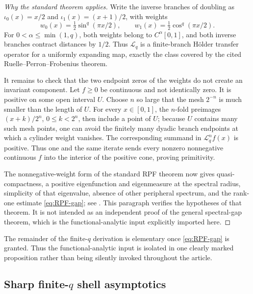\documentclass[11pt,oneside]{article}
\numberwithin{equation}{section}
\theoremstyle{definition}
\theoremstyle{remark}
\newcommand{\Transfer}{\mathcal L}
\begin{document}
\begin{proof}[Why the standard theorem applies]
Write the inverse branches of doubling as
\(\iota_0(x)=x/2\) and \(\iota_1(x)=(x+1)/2\), with weights
\[
 w_0(x)=\tfrac12\sin^q(\pi x/2),
 \qquad
 w_1(x)=\tfrac12\cos^q(\pi x/2).
\]
For \(0<\alpha\le\min(1,q)\), both weights belong to \(C^\alpha[0,1]\), and both inverse
branches contract distances by \(1/2\).  Thus \(\Transfer_q\) is a finite-branch H\"older
transfer operator for a uniformly expanding map, exactly the class covered by the cited
Ruelle--Perron--Frobenius theorem.

It remains to check that the two endpoint zeros of the weights do not create an invariant
component.  Let \(f\ge0\) be continuous and not identically zero.  It is positive on some
open interval \(U\).  Choose \(n\) so large that the mesh \(2^{-n}\) is much smaller than
the length of \(U\).  For every \(x\in[0,1]\), the \(n\)-fold preimages
\((x+k)/2^n\), \(0\le k<2^n\), then include a point of \(U\); because \(U\) contains many
such mesh points, one can avoid the finitely many dyadic branch endpoints at which a
cylinder weight vanishes.  The corresponding summand in \(\Transfer_q^nf(x)\) is positive.
Thus one and the same iterate sends every nonzero nonnegative continuous \(f\) into the
interior of the positive cone, proving primitivity.

The nonnegative-weight form of the standard RPF theorem now gives quasi-compactness, a
positive eigenfunction and eigenmeasure at the spectral radius, simplicity of that
eigenvalue, absence of other peripheral spectrum, and the rank-one estimate
\eqref{eq:RPF-gap}; see \cite{baladi,fan1997}.  This paragraph verifies the hypotheses of
that theorem.  It is not intended as an independent proof of the general spectral-gap
theorem, which is the functional-analytic input explicitly imported here.
\end{proof}

\begin{statusbox}
The remainder of the finite-\(q\) derivation is elementary once
\eqref{eq:RPF-gap} is granted.  Thus the functional-analytic input is isolated in one clearly
marked proposition rather than being silently invoked throughout the article.
\end{statusbox}

\subsection{Sharp finite-\texorpdfstring{\(q\)}{q} shell asymptotics}
\end{document}
